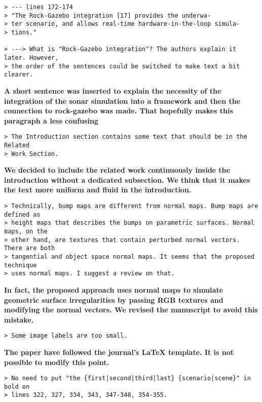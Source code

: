 \documentclass{article}
\begin{document}
\begin{verbatim}
> --- lines 172-174
> "The Rock-Gazebo integration [17] provides the underwa-
> ter scenario, and allows real-time hardware-in-the-loop simula-
> tions."

> ---> What is "Rock-Gazebo integration"? The authors explain it later. However,
> the order of the sentences could be switched to make text a bit clearer.
\end{verbatim}

\textbf{A short sentence was inserted to explain the necessity of the integration of the
sonar simulation into a framework and then the connection to rock-gazebo was made.
That hopefully makes this paragraph a less confusing}

\begin{verbatim}
> The Introduction section contains some text that should be in the Related
> Work Section.
\end{verbatim}

\textbf{We decided to include the related work continuously inside the introduction
without a dedicated subsection. We think that it makes the text more uniform and fluid
in the introduction.}

\begin{verbatim}
> Technically, bump maps are different from normal maps. Bump maps are defined as
> height maps that describes the bumps on parametric surfaces. Normal maps, on the
> other hand, are textures that contain perturbed normal vectors. There are both
> tangential and object space normal maps. It seems that the proposed technique
> uses normal maps. I suggest a review on that.
\end{verbatim}

\textbf{In fact, the proposed approach uses normal maps to simulate geometric surface
irregularities by passing RGB textures and modifying the normal vectors. We revised the
manuscript to avoid this mistake.}

\begin{verbatim}
> Some image labels are too small.
\end{verbatim}

\textbf{The paper have followed the journal's LaTeX template. It is not possible to modify
this point.}

\begin{verbatim}
> No need to put "the {first|second|third|last} {scenario|scene}" in bold on
> lines 322, 327, 334, 343, 347-348, 354-355.
\end{verbatim}
\end{document}
